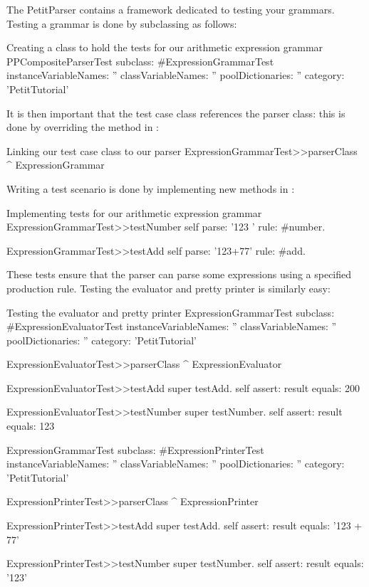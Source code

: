 \documentclass[a4paper,10pt,twoside]{book}
\begin{document}
The PetitParser contains a framework dedicated to testing your
grammars. Testing a grammar is done by subclassing
 as follows:

\begin{script}{Creating a class to hold the tests for our arithmetic expression grammar}
PPCompositeParserTest subclass: #ExpressionGrammarTest
  instanceVariableNames: ''
  classVariableNames: ''
  poolDictionaries: ''
  category: 'PetitTutorial'
\end{script}

It is then important that the test case class references the parser
class: this is done by overriding the
 method in
:

\begin{script}{Linking our test case class to our parser}
ExpressionGrammarTest>>parserClass
  ^ ExpressionGrammar
\end{script}

Writing a test scenario is done by implementing new methods in
:

\begin{script}{Implementing tests for our arithmetic expression grammar}
ExpressionGrammarTest>>testNumber
  self parse: '123 ' rule: #number.

ExpressionGrammarTest>>testAdd
  self parse: '123+77' rule: #add.
\end{script}

These tests ensure that the  parser can parse
some expressions using a specified production rule. Testing the
evaluator and pretty printer is similarly easy:

\begin{script}{Testing the evaluator and pretty printer}
ExpressionGrammarTest subclass: #ExpressionEvaluatorTest
  instanceVariableNames: ''
  classVariableNames: ''
  poolDictionaries: ''
  category: 'PetitTutorial'

ExpressionEvaluatorTest>>parserClass
  ^ ExpressionEvaluator

ExpressionEvaluatorTest>>testAdd
  super testAdd.
  self assert: result equals: 200

ExpressionEvaluatorTest>>testNumber
  super testNumber.
  self assert: result equals: 123

ExpressionGrammarTest subclass: #ExpressionPrinterTest
  instanceVariableNames: ''
  classVariableNames: ''
  poolDictionaries: ''
  category: 'PetitTutorial'

ExpressionPrinterTest>>parserClass
  ^ ExpressionPrinter

ExpressionPrinterTest>>testAdd
  super testAdd.
  self assert: result equals: '123 + 77'

ExpressionPrinterTest>>testNumber
  super testNumber.
  self assert: result equals: '123'
\end{script}
\end{document}
